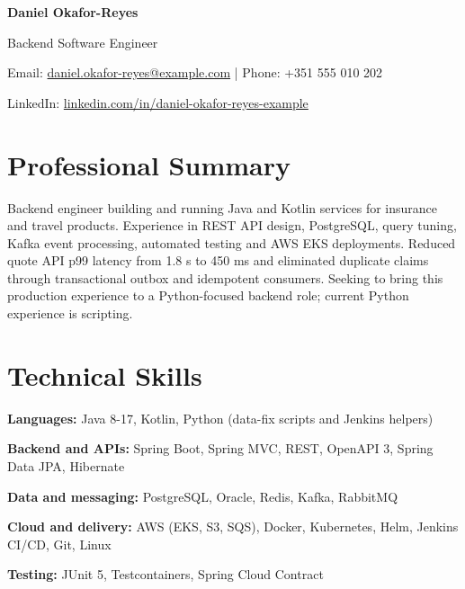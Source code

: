 \documentclass[11pt,a4paper]{article}
\newcommand{\cvsection}[1]{\section*{#1}}
\begin{document}
{\Huge\bfseries\color{primarycolor} Daniel Okafor-Reyes}\par
{\large\color{accentcolor} Backend Software Engineer}\par
{\small Email: \href{mailto:daniel.okafor-reyes@example.com}{daniel.okafor-reyes@example.com} | Phone: +351 555 010 202\par
LinkedIn: \href{https://linkedin.com/in/daniel-okafor-reyes-example}{linkedin.com/in/daniel-okafor-reyes-example}}\par

\cvsection{Professional Summary}
Backend engineer building and running Java and Kotlin services for insurance and travel products. Experience in REST API design, PostgreSQL, query tuning, Kafka event processing, automated testing and AWS EKS deployments. Reduced quote API p99 latency from 1.8 s to 450 ms and eliminated duplicate claims through transactional outbox and idempotent consumers. Seeking to bring this production experience to a Python-focused backend role; current Python experience is scripting.

\cvsection{Technical Skills}
\textbf{Languages:} Java 8-17, Kotlin, Python (data-fix scripts and Jenkins helpers)\par
\textbf{Backend and APIs:} Spring Boot, Spring MVC, REST, OpenAPI 3, Spring Data JPA, Hibernate\par
\textbf{Data and messaging:} PostgreSQL, Oracle, Redis, Kafka, RabbitMQ\par
\textbf{Cloud and delivery:} AWS (EKS, S3, SQS), Docker, Kubernetes, Helm, Jenkins CI/CD, Git, Linux\par
\textbf{Testing:} JUnit 5, Testcontainers, Spring Cloud Contract
\end{document}
